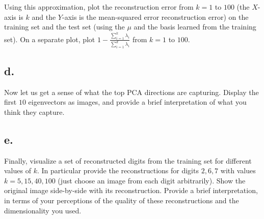 \documentclass{article}
\newcommand{\1}{\mathbf{1}}
\begin{document}
{Using this approximation, plot the reconstruction error from $k=1$ to $100$ (the $X$-axis is $k$ and the $Y$-axis is the mean-squared error reconstruction error) on the training set and the test set (using the $\mu$ and the basis learned from the training set). On a separate plot, plot $1-\frac{\sum_{i=1}^{k}{\lambda_i}}{\sum_{i=1}^{d}{\lambda_i}}$ from $k=1$ to $100$.

\subsection*{d.}

Now let us get a sense of what the top PCA directions are capturing. Display the first $10$ eigenvectors as images, and provide a brief interpretation of what you think they capture.

\subsection*{e.}

Finally, visualize a set of reconstructed digits from the training set for different values of $k$. In particular provide the reconstructions for digits $2, 6, 7$ with values $k = 5, 15, 40, 100$ (just choose an image from each digit arbitrarily). Show the original image side-by-side with its reconstruction. Provide a brief interpretation, in terms of your perceptions of the quality of these reconstructions and the dimensionality you used.

}
\end{document}
